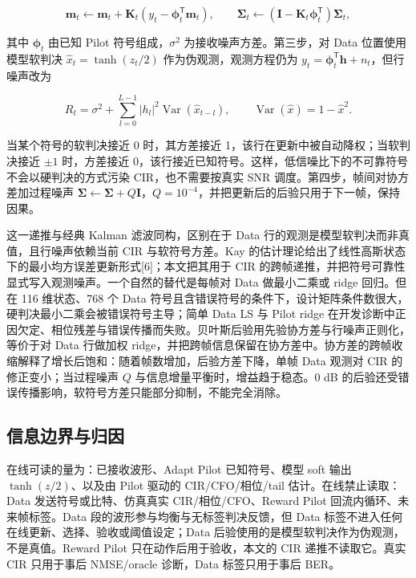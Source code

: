 \begin{equation*}
\mathbf{m}_t\leftarrow\mathbf{m}_t+\mathbf{K}_t\left(y_t-\boldsymbol{\phi}_t^{\mathsf T}\mathbf{m}_t\right),\qquad
\boldsymbol{\Sigma}_t\leftarrow\left(\mathbf{I}-\mathbf{K}_t\boldsymbol{\phi}_t^{\mathsf T}\right)\boldsymbol{\Sigma}_t,
\end{equation*}

其中 $\boldsymbol{\phi}_t$ 由已知 Pilot 符号组成，$\sigma^2$ 为接收噪声方差。第三步，对 Data 位置使用模型软判决 $\hat{x}_t=\tanh(z_t/2)$ 作为伪观测，观测方程仍为 $y_t=\boldsymbol{\phi}_t^{\mathsf T}\mathbf{h}+n_t$，但行噪声改为

\begin{equation*}
R_t=\sigma^2+\sum_{l=0}^{L-1}|h_l|^2\operatorname{Var}(\hat{x}_{t-l}),\qquad
\operatorname{Var}(\hat{x})=1-\hat{x}^2.
\end{equation*}

当某个符号的软判决接近 0 时，其方差接近 1，该行在更新中被自动降权；当软判决接近 $\pm1$ 时，方差接近 0，该行接近已知符号。这样，低信噪比下的不可靠符号不会以硬判决的方式污染 CIR，也不需要按真实 SNR 调度。第四步，帧间对协方差加过程噪声 $\boldsymbol{\Sigma}\leftarrow\boldsymbol{\Sigma}+Q\mathbf{I}$，$Q=10^{-4}$，并把更新后的后验只用于下一帧，保持因果。

这一递推与经典 Kalman 滤波同构，区别在于 Data 行的观测是模型软判决而非真值，且行噪声依赖当前 CIR 与软符号方差。Kay 的估计理论给出了线性高斯状态下的最小均方误差更新形式[6]；本文把其用于 CIR 的跨帧递推，并把符号可靠性显式写入观测噪声。一个自然的替代是每帧对 Data 做最小二乘或 ridge 回归。但在 116 维状态、768 个 Data 符号且含错误符号的条件下，设计矩阵条件数很大，硬判决最小二乘会被错误符号主导；简单 Data LS 与 Pilot ridge 在开发诊断中正因欠定、相位残差与错误传播而失败。贝叶斯后验用先验协方差与行噪声正则化，等价于对 Data 行做加权 ridge，并把跨帧信息保留在协方差中。协方差的跨帧收缩解释了增长后饱和：随着帧数增加，后验方差下降，单帧 Data 观测对 CIR 的修正变小；当过程噪声 $Q$ 与信息增量平衡时，增益趋于稳态。0 dB 的后验还受错误传播影响，软符号方差只能部分抑制，不能完全消除。

\subsection{信息边界与归因}

在线可读的量为：已接收波形、Adapt Pilot 已知符号、模型 soft 输出 $\tanh(z/2)$、以及由 Pilot 驱动的 CIR/CFO/相位/tail 估计。在线禁止读取：Data 发送符号或比特、仿真真实 CIR/相位/CFO、Reward Pilot 回流内循环、未来帧标签。Data 段的波形参与均衡与无标签判决反馈，但 Data 标签不进入任何在线更新、选择、验收或阈值设定；Data 后验使用的是模型软判决作为伪观测，不是真值。Reward Pilot 只在动作后用于验收，本文的 CIR 递推不读取它。真实 CIR 只用于事后 NMSE/oracle 诊断，Data 标签只用于事后 BER。

